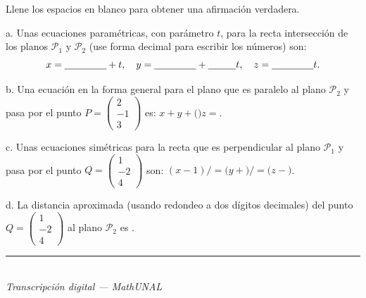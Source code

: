 \documentclass[11pt]{article}
\newcommand{\vectiii}[3]{\begin{pmatrix}#1\\#2\\#3\end{pmatrix}}
\newcommand{\examfooter}{%
  \vfill
  \rule{\linewidth}{0.4pt}\\[1pt]
  {\scriptsize\textit{Transcripción digital --- MathUNAL}\hfill\textcolor{unalblue}{\textbf{\thepage}}}
}
\begin{document}
\begin{enumerate}
Llene los espacios en blanco para obtener una afirmación verdadera.

a. Unas ecuaciones paramétricas, con parámetro $t$, para la recta intersección de los planos $\mathcal{P}_1$ y $\mathcal{P}_2$ (use forma decimal para escribir los números) son:
$$x=\underline{\hspace{1.5cm}}+t,\quad y=\underline{\hspace{1.5cm}}+\underline{\hspace{1cm}}t,\quad z=\underline{\hspace{1.5cm}}t.$$

b. Una ecuación en la forma general para el plano que es paralelo al plano $\mathcal{P}_2$ y pasa por el punto $P=\vectiii{2}{-1}{3}$ es: $x+$\underline{\hspace{1cm}}$y+($\underline{\hspace{1cm}}$)z=$\underline{\hspace{1cm}}.

c. Unas ecuaciones simétricas para la recta que es perpendicular al plano $\mathcal{P}_1$ y pasa por el punto $Q=\vectiii{1}{-2}{4}$ son: $(x-1)/$\underline{\hspace{1cm}}$=(y+$\underline{\hspace{1cm}}$)/$\underline{\hspace{1cm}}$=(z-$\underline{\hspace{1cm}}$)$.

d. La distancia aproximada (usando redondeo a dos dígitos decimales) del punto $Q=\vectiii{1}{-2}{4}$ al plano $\mathcal{P}_2$ es \underline{\hspace{2cm}}.

\end{enumerate}

\examfooter
\end{document}
